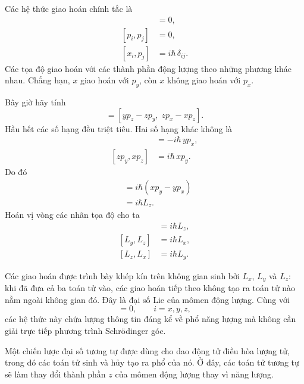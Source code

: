 Các hệ thức giao hoán chính tắc là
\begin{align}
[x_i,x_j]&=0,\\
[p_i,p_j]&=0,\\
[x_i,p_j]&=i\hbar\,\delta_{ij}.
\end{align}
Các tọa độ giao hoán với các thành phần động lượng theo những phương khác nhau. Chẳng hạn, \(x\) giao hoán với \(p_y\), còn \(x\) không giao hoán với \(p_x\).

Bây giờ hãy tính
\begin{equation}
[L_x,L_y]
=
[yp_z-zp_y,\;zp_x-xp_z].
\end{equation}
Hầu hết các số hạng đều triệt tiêu. Hai số hạng khác không là
\begin{align}
[yp_z,zp_x]&=-i\hbar\,yp_x,\\
[zp_y,xp_z]&=i\hbar\,xp_y.
\end{align}
Do đó
\begin{align}
[L_x,L_y]
&=i\hbar\left(xp_y-yp_x\right)\\
&=i\hbar L_z.
\end{align}
Hoán vị vòng các nhãn tọa độ cho ta
\begin{align}
[L_x,L_y]&=i\hbar L_z,\\
[L_y,L_z]&=i\hbar L_x,\\
[L_z,L_x]&=i\hbar L_y.
\end{align}

\begin{classroomqa}
\end{classroomqa}

Các giao hoán được trình bày khép kín trên không gian sinh bởi \(L_x\), \(L_y\) và \(L_z\): khi đã đưa cả ba toán tử vào, các giao hoán tiếp theo không tạo ra toán tử nào nằm ngoài không gian đó. Đây là đại số Lie của mômen động lượng. Cùng với
\begin{equation}
[H,L_i]=0,
\qquad i=x,y,z,
\end{equation}
các hệ thức này chứa lượng thông tin đáng kể về phổ năng lượng mà không cần giải trực tiếp phương trình Schr\"odinger góc.

Một chiến lược đại số tương tự được dùng cho dao động tử điều hòa lượng tử, trong đó các toán tử sinh và hủy tạo ra phổ của nó. Ở đây, các toán tử tương tự sẽ làm thay đổi thành phần \(z\) của mômen động lượng thay vì năng lượng.

